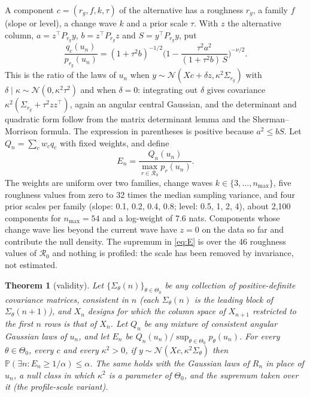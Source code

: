 \documentclass[11pt]{article}
\theoremstyle{plain}
\newtheorem{theorem}{Theorem}
\theoremstyle{definition}
\newcommand{\Prob}{\mathbb{P}}
\begin{document}
A component $c = (r_g, f, k, \tau)$ of the alternative has a roughness $r_g$, a family $f$ (slope or level), a change wave $k$ and a prior scale $\tau$. With $z$ the alternative column, $a = z^\top P_{r_g} y$, $b = z^\top P_{r_g} z$ and $S = y^\top P_{r_g} y$, put
\begin{equation}
\frac{q_c(u_n)}{p_{r_g}(u_n)} = (1 + \tau^2 b)^{-1/2}\Big(1 - \frac{\tau^2 a^2}{(1+\tau^2 b)\,S}\Big)^{-\nu/2}.
\label{eq:bf}
\end{equation}
This is the ratio of the laws of $u_n$ when $y \sim \mathcal{N}(Xc + \delta z, \kappa^2\Sigma_{r_g})$ with $\delta \mid \kappa \sim \mathcal{N}(0,\kappa^2\tau^2)$ and when $\delta=0$: integrating out $\delta$ gives covariance $\kappa^2(\Sigma_{r_g}+\tau^2 zz^\top)$, again an angular central Gaussian, and the determinant and quadratic form follow from the matrix determinant lemma and the Sherman--Morrison formula. The expression in parentheses is positive because $a^2 \le b S$. Let $Q_n = \sum_c w_c q_c$ with fixed weights, and define
\begin{equation}
E_n = \frac{Q_n(u_n)}{\max_{r \in \mathcal{R}_0} p_r(u_n)}.
\label{eq:E}
\end{equation}
The weights are uniform over two families, change waves $k\in\{3,\dots,n_{\max}\}$, five roughness values from zero to 32 times the median sampling variance, and four prior scales per family (slope: 0.1, 0.2, 0.4, 0.8; level: 0.5, 1, 2, 4), about 2,100 components for $n_{\max}=54$ and a log-weight of 7.6 nats. Components whose change wave lies beyond the current wave have $z = 0$ on the data so far and contribute the null density. The supremum in \eqref{eq:E} is over the 46 roughness values of $\mathcal{R}_0$ and nothing is profiled: the scale has been removed by invariance, not estimated.

\begin{theorem}[validity]
\label{thm:validity}
Let $\{\Sigma_\theta(n)\}_{\theta\in\Theta_0}$ be any collection of positive-definite covariance matrices, consistent in $n$ (each $\Sigma_\theta(n)$ is the leading block of $\Sigma_\theta(n+1)$), and $X_n$ designs for which the column space of $X_{n+1}$ restricted to the first $n$ rows is that of $X_n$. Let $Q_n$ be any mixture of consistent angular Gaussian laws of $u_n$, and let $E_n$ be $Q_n(u_n)/\sup_{\theta\in\Theta_0}p_\theta(u_n)$. For every $\theta\in\Theta_0$, every $c$ and every $\kappa^2>0$, if $y\sim\mathcal{N}(Xc,\kappa^2\Sigma_\theta)$ then $\Prob(\exists n: E_n\ge 1/\alpha)\le\alpha$. The same holds with the Gaussian laws of $R_n$ in place of $u_n$, a null class in which $\kappa^2$ is a parameter of $\Theta_0$, and the supremum taken over it (the profile-scale variant).
\end{theorem}
\end{document}
